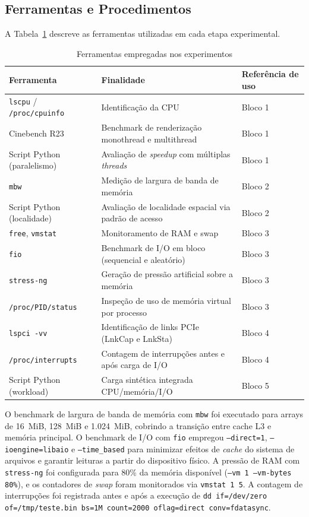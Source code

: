 \documentclass[12pt]{article}
\begin{document}
\subsection{Ferramentas e Procedimentos}

A Tabela~\ref{tab:ferramentas} descreve as ferramentas utilizadas em cada etapa experimental.

\begin{table}[H]
\centering
\caption{Ferramentas empregadas nos experimentos}
\label{tab:ferramentas}
\begin{tabular}{lll}
\toprule
\textbf{Ferramenta} & \textbf{Finalidade} & \textbf{Referência de uso} \\
\midrule
\texttt{lscpu} / \texttt{/proc/cpuinfo} & Identificação da CPU & Bloco 1 \\
Cinebench R23 & Benchmark de renderização monothread e multithread & Bloco 1 \\
Script Python (paralelismo) & Avaliação de \textit{speedup} com múltiplas \textit{threads} & Bloco 1 \\
\texttt{mbw} & Medição de largura de banda de memória & Bloco 2 \\
Script Python (localidade) & Avaliação de localidade espacial via padrão de acesso & Bloco 2 \\
\texttt{free}, \texttt{vmstat} & Monitoramento de RAM e swap & Bloco 3 \\
\texttt{fio} & Benchmark de I/O em bloco (sequencial e aleatório) & Bloco 3 \\
\texttt{stress-ng} & Geração de pressão artificial sobre a memória & Bloco 3 \\
\texttt{/proc/PID/status} & Inspeção de uso de memória virtual por processo & Bloco 3 \\
\texttt{lspci -vv} & Identificação de links PCIe (LnkCap e LnkSta) & Bloco 4 \\
\texttt{/proc/interrupts} & Contagem de interrupções antes e após carga de I/O & Bloco 4 \\
Script Python (workload) & Carga sintética integrada CPU/memória/I/O & Bloco 5 \\
\bottomrule
\end{tabular}
\end{table}

O benchmark de largura de banda de memória com \texttt{mbw} foi executado para arrays de 16~MiB, 128~MiB e 1.024~MiB, cobrindo a transição entre cache L3 e memória principal. O benchmark de I/O com \texttt{fio} empregou \texttt{--direct=1}, \texttt{--ioengine=libaio} e \texttt{--time\_based} para minimizar efeitos de \textit{cache} do sistema de arquivos e garantir leituras a partir do dispositivo físico. A pressão de RAM com \texttt{stress-ng} foi configurada para 80\% da memória disponível (\texttt{--vm 1 --vm-bytes 80\%}), e os contadores de \textit{swap} foram monitorados via \texttt{vmstat 1 5}. A contagem de interrupções foi registrada antes e após a execução de \texttt{dd if=/dev/zero of=/tmp/teste.bin bs=1M count=2000 oflag=direct conv=fdatasync}.
\end{document}
